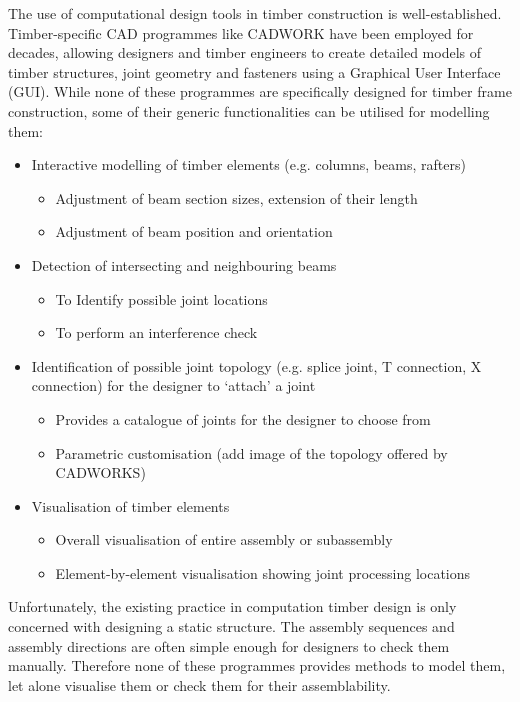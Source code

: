 The use of computational design tools in timber construction is well-established. Timber-specific CAD programmes like CADWORK have been employed for decades, allowing designers and timber engineers to create detailed models of timber structures, joint geometry and fasteners using a Graphical User Interface (GUI). 
While none of these programmes are specifically designed for timber frame construction, some of their generic functionalities can be utilised for modelling them:
\begin{itemize}
    \item Interactive modelling of timber elements (e.g. columns, beams, rafters)
    \begin{itemize}
        \item Adjustment of beam section sizes, extension of their length
        \item Adjustment of beam position and orientation
    \end{itemize}
    \item Detection of intersecting and neighbouring beams
    \begin{itemize}
        \item To Identify possible joint locations
        \item To perform an interference check
    \end{itemize}
    \item Identification of possible joint topology (e.g. splice joint, T connection, X connection) for the designer to ‘attach’ a joint
    \begin{itemize}
        \item Provides a catalogue of joints for the designer to choose from
        \item Parametric customisation (add image of the topology offered by CADWORKS)
    \end{itemize}
     \item Visualisation of timber elements
    \begin{itemize}
        \item Overall visualisation of entire assembly or subassembly
        \item Element-by-element visualisation showing joint processing locations
    \end{itemize}
\end{itemize}

Unfortunately, the existing practice in computation timber design is only concerned with designing a static structure. The assembly sequences and assembly directions are often simple enough for designers to check them manually. Therefore none of these programmes provides methods to model them, let alone visualise them or check them for their assemblability. 

